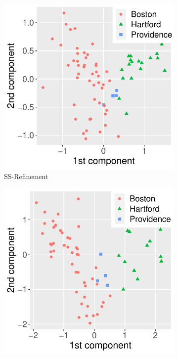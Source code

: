 \documentclass[12pt]{article}
\begin{document}
\begin{figure}
\centering
\begin{subfigure}{0.28\textwidth}
	\centering
	\includegraphics[width=1\linewidth]{Figures/Law_Z.pdf}
    \caption{SS-Refinement}
\end{subfigure}\quad 
\begin{subfigure}{0.28\textwidth}
	\centering
	\includegraphics[width=1\linewidth]{Figures/Lawp_Z.pdf}

\end{subfigure}
\end{figure}
\end{document}
